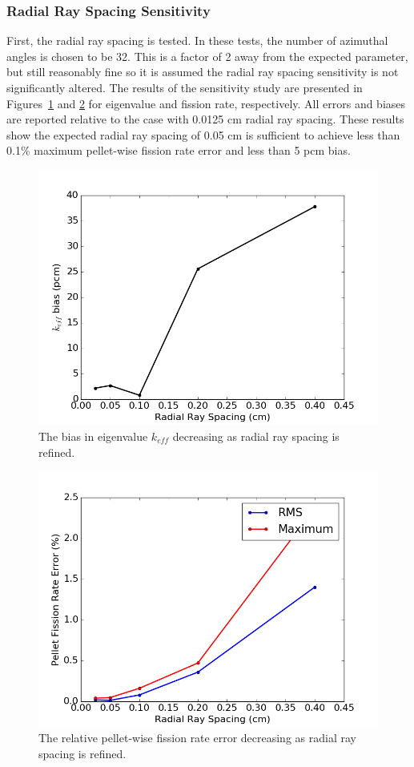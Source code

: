 \subsubsection{Radial Ray Spacing Sensitivity}

First, the radial ray spacing is tested. In these tests, the number of azimuthal angles is chosen to be 32. This is a factor of 2 away from the expected parameter, but still reasonably fine so it is assumed the radial ray spacing sensitivity is not significantly altered. The results of the sensitivity study are presented in Figures~\ref{fig:radial-rs-pcm} and \ref{fig:radial-rs-fr} for eigenvalue and fission rate, respectively. All errors and biases are reported relative to the case with 0.0125 cm radial ray spacing. These results show the expected radial ray spacing of 0.05 cm is sufficient to achieve less than 0.1\% maximum pellet-wise fission rate error and less than 5 pcm bias.

\begin{figure}[h!]
	\centering
	\includegraphics[width=0.7\linewidth]{figures/results/sensitivity/rad_spacing_pcm.png}
	\caption[]{The bias in eigenvalue $k_{\textit{eff}}$ decreasing as radial ray spacing is refined.}
	\label{fig:radial-rs-pcm}
\end{figure}
\begin{figure}[h!]
	\centering
	\includegraphics[width=0.7\linewidth]{figures/results/sensitivity/rad_spacing_fr_new.png}
	\caption[]{The relative pellet-wise fission rate error decreasing as radial ray spacing is refined.}
	\label{fig:radial-rs-fr}
\end{figure}

